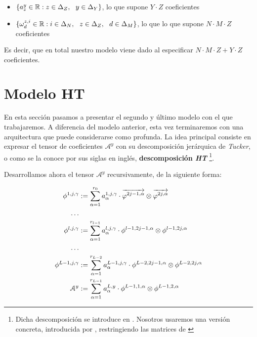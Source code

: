 \begin{itemize}
    \item $\{a_z^y \in \mathbb{R} : z \in \Delta_{Z}, \ \  y \in \Delta_{Y}\}$, lo que supone $Y \cdot Z$ coeficientes
    \item $\{\omega_d^{z, i} \in \mathbb{R}: i \in \Delta_{N}, \ \  z \in \Delta_{Z}, \ \  d \in \Delta_{M}\}$, lo que lo que supone $N \cdot M \cdot Z$ coeficientes
\end{itemize}

Es decir, que en total nuestro modelo viene dado al especificar $N \cdot M \cdot Z + Y \cdot Z$ coeficientes.

\section{Modelo HT} \label{sec:modelo_ht}

En esta sección pasamos a presentar el segundo y último modelo con el que trabajaremos. A diferencia del modelo anterior, esta vez terminaremos con una arquitectura que puede considerarse como profunda. La idea principal consiste en expresar el tensor de coeficientes $\mathcal{A}^y$ con su descomposición jerárquica de \textit{Tucker}, o como se la conoce por sus siglas en inglés, \textbf{descomposición \textit{HT}} \footnote{Dicha descomposición se introduce en \cite{matematicas:descomposicion_ht}. Nosotros usaremos una versión concreta, introducida por \cite{matematicas:principal}, restringiendo las matrices de \cite{matematicas:descomposicion_ht}}.

Desarrollamos ahora el tensor $\mathcal{A}^y$ recursivamente, de la siguiente forma:

\begin{equation} \label{eq:descomposicion_ht}
\begin{split}
    \phi^{1, j, \gamma} &:= \sum_{\alpha = 1}^{r_0} a_{\alpha}^{1, j, \gamma} \cdot \overrightarrow{\varphi^{2j-1, \alpha}} \otimes \overrightarrow{\varphi^{2j, \alpha}} \\
    \ldots \\
    \phi^{l, j, \gamma} &:= \sum_{\alpha = 1}^{r_{l-1}} a_{\alpha}^{l, j, \gamma} \cdot \phi^{l-1, 2j-1, \alpha} \otimes \phi^{l-1, 2j, \alpha} \\
    \ldots \\
    \phi^{L - 1, j, \gamma} &:= \sum_{\alpha = 1}^{r_{L-2}} a_{\alpha}^{L - 1, j, \gamma} \cdot \phi^{L-2, 2j-1, \alpha} \otimes \phi^{L-2, 2j, \alpha} \\
    \mathcal{A}^y &:= \sum_{\alpha = 1}^{r_{L-1}} a_{\alpha}^{L, y} \cdot \phi^{L-1, 1, \alpha} \otimes \phi^{L-1, 2, \alpha}
\end{split}
\end{equation}

